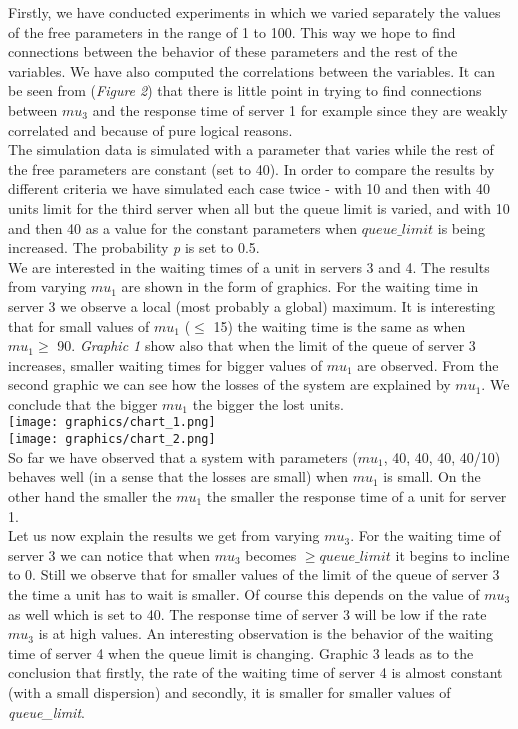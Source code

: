 \documentclass[12pt]{article}
\theoremstyle{plain}
\begin{document}
Firstly, we have conducted experiments in which we varied separately the values of
the free parameters in the range of 1 to 100. This way we hope to find connections
between the behavior of these parameters and the rest of the variables. We have
also computed the correlations between the variables. It can be seen from
(\emph{Figure 2}) that there is little point in trying to find connections
between $mu_3$ and the response time of server 1 for example since they are
weakly correlated and because of pure logical reasons.\\
The simulation data is simulated with a parameter that varies while the rest of
the free parameters are constant (set to 40). In order to compare the results by
different criteria we have simulated each case twice - with 10 and then with 40
units limit for the third server when all but the queue limit is varied, and with
10 and then 40 as a value for the constant parameters when $queue\_limit$ is
being increased. The probability \emph{p} is set to 0.5.\\
We are interested in the waiting times of a unit in servers 3 and 4. The results
from varying $mu_1$ are shown in the form of graphics. For the waiting time in
server 3 we observe a local (most probably a global) maximum. It is interesting
that for small values of $mu_1$ ($\le$ 15) the waiting time is the same as when
$mu_1 \ge$ 90. \emph{Graphic 1} show also that when the limit of the queue of
server 3 increases, smaller waiting times for bigger values of $mu_1$ are
observed. From the second graphic we can see how the losses of the system are
explained by $mu_1$. We conclude that the bigger $mu_1$ the bigger the lost
units.\\

\texttt{[image: graphics/chart\_1.png]}\\
\texttt{[image: graphics/chart\_2.png]}\\

So far we have observed that a system with parameters ($mu_1$, 40, 40, 40,
40/10) behaves well (in a sense that the losses are small) when $mu_1$ is small.
On the other hand the smaller the $mu_1$ the smaller the response time of a unit
for server 1.\\
Let us now explain the results we get from varying $mu_3$. For the waiting time
of server 3 we can notice that when $mu_3$ becomes $\ge queue\_limit$ it begins
to incline to 0. Still we observe that for smaller values of the limit of the queue
of server 3 the time a unit has to wait is smaller. Of course this depends on the
value of $mu_3$ as well which is set to 40. The response time of server 3 will be
low if the rate $mu_3$ is at high values. An interesting observation is the behavior
of the waiting time of server 4 when the queue limit is changing. Graphic 3 leads
as to the conclusion that firstly, the rate of the waiting time of server 4 is almost
constant (with a small dispersion) and secondly, it is smaller for smaller values
of \emph{queue\_limit}.\\
\end{document}
